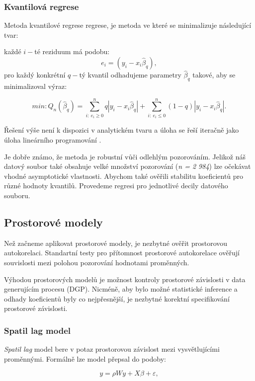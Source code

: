 \documentclass[11pt, a4paper]{article}
\begin{document}
\subsubsection{Kvantilová regrese}
Metoda kvantilové regrese regrese, je metoda ve které se minimalizuje následující tvar:
  
  každé $i-$té reziduum má podobu:
  $$e_{i} = (y_{i} - x_{i}\hat\beta_{q}), $$
  pro každý konkrétní $q-$tý kvantil odhadujeme parametry $\hat \beta_{q}$ takové, aby se minimalizoval výraz:
  
  $$min: Q_{n}(\hat\beta_{q}) = \sum_{i:\ e_{i}\geq 0}^{n} q|y_{i} - x_{i} \hat\beta_{q}| + \sum_{i:\ e_{i}	\leq 0}^{n} (1-q)|y_{i} - x_{i} \hat\beta_{q}|.$$
  
  Řešení výše není k dispozici v analytickém tvaru a úloha se řeší iteračně jako úloha lineárního programování \cite{greene2003econometric}.

Je dobře známo, že metoda je robustní vůči odlehlým pozorováním. Jelikož náš datový soubor také obsahuje velké množství pozorování (\textit{n = 2 984}) lze očekávat vhodné asymptotické vlastnosti. Abychom také ověřili stabilitu koeficientů pro různé hodnoty kvantilů. Provedeme regresi pro jednotlivé decily datového souboru.

\subsection{Prostorové modely}
Než začneme aplikovat prostorové modely, je nezbytné ověřit prostorovou autokorelaci. Standartní testy pro přítomnost prostorové autokorelace ověřují souvislosti mezi polohou pozorování hodnotami proměnných. 

Výhodou prostorových modelů je možnost kontroly prostorové závislosti v data generujícím procesu (DGP). Nicméně, aby bylo možné statistické inference a odhady koeficientů byly co nejpřesnější, je nezbytné korektní specifikování prostorové závislosti.

\subsubsection{Spatil lag model}

\textit{Spatil lag} model bere v potaz prostorovou závislost mezi vysvětlujícími proměnnými. Formálně lze model přepsal do podoby:
  
  \begin{equation} \label{spatial lag}
y = \rho W y + X\beta + \varepsilon, 
\end{equation}
\end{document}
